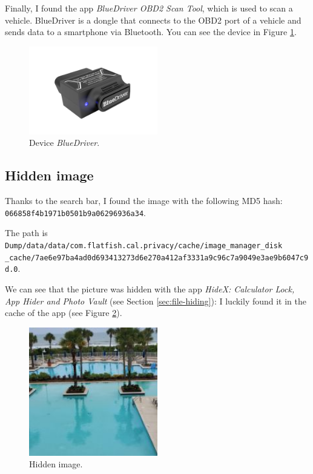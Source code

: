 \documentclass[12pt]{article}
\begin{document}
Finally, I found the app \textit{BlueDriver OBD2 Scan Tool}, which is used to scan a vehicle. BlueDriver is a dongle that connects to the OBD2 port of a vehicle and sends data to a smartphone via Bluetooth. You can see the device in Figure \ref{fig:bluedriver}.

\begin{figure}[!ht]
    \centering
    \includegraphics[width=0.5\textwidth]{images/bluedriver.png}
    \caption{Device \textit{BlueDriver}.}
    \label{fig:bluedriver}
\end{figure}

\subsection{Hidden image}

Thanks to the search bar, I found the image with the following MD5 hash: \\
\texttt{066858f4b1971b0501b9a06296936a34}. 

The path is \texttt{Dump/data/data/com.flatfish.cal.privacy/cache/image\_manager\_disk \\ \_cache/7ae6e97ba4ad0d693413273d6e270a412af3331a9c96c7a9049e3ae9b6047c9d.0}.

We can see that the picture was hidden with the app \textit{HideX: Calculator Lock, App Hider and Photo Vault} (see Section \ref{sec:file-hiding}): I luckily found it in the cache of the app (see Figure \ref{fig:cache}).

\begin{figure}[!ht]
    \centering
    \includegraphics[width=0.5\textwidth]{images/hidden.png}
    \caption{Hidden image.}
    \label{fig:cache}
\end{figure}
\end{document}
